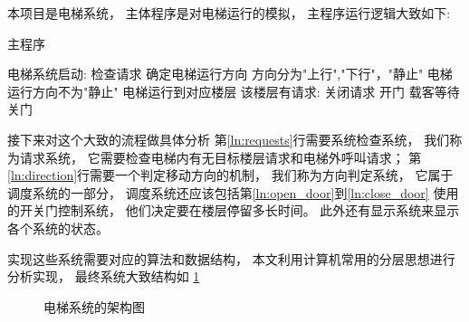 \documentclass[../main.tex]{subfiles} %
\begin{document}
本项目是电梯系统，
主体程序是对电梯运行的模拟，
主程序运行逻辑大致如下:

\begin{algorithm}[H]
  \caption{主程序}
  \begin{codebox}
      \li \While 电梯系统启动:
      \Then
        \li 检查请求 \label{ln:requests}
        \li 确定电梯运行方向 \label{ln:direction}
          \Comment 方向分为"上行","下行"，"静止"
        \li \If 电梯运行方向不为"静止"
        \Then
          \li 电梯运行到对应楼层
        \End
        \li \If 该楼层有请求:
        \Then
          \li 关闭请求
          \li 开门 \label{ln:open_door}
          \li 载客等待
          \li 关门 \label{ln:close_door}
        \End
      \End
  \end{codebox}
  \label{alg:main}
\end{algorithm}

接下来对这个大致的流程做具体分析
第\ref{ln:requests}行需要系统检查系统，
我们称为请求系统，
它需要检查电梯内有无目标楼层请求和电梯外呼叫请求；
第\ref{ln:direction}行需要一个判定移动方向的机制，
我们称为方向判定系统，
它属于调度系统的一部分，
调度系统还应该包括第\ref{ln:open_door}到\ref{ln:close_door}
使用的开关门控制系统，
他们决定要在楼层停留多长时间。
此外还有显示系统来显示各个系统的状态。

实现这些系统需要对应的算法和数据结构，
本文利用计算机常用的分层思想进行分析实现，
最终系统大致结构如%
\cref{fig:structure}

\begin{figure}[H]
  \centering
  \def\svgwidth{\linewidth}
  
  \caption{电梯系统的架构图}
  \label{fig:structure}
\end{figure}
\end{document}
